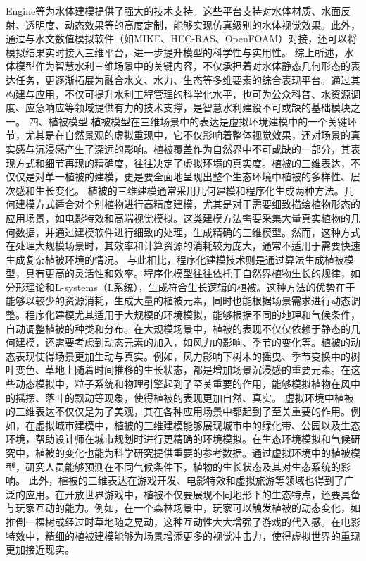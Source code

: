 Engine等为水体建模提供了强大的技术支持。这些平台支持对水体材质、水面反射、透明度、动态效果等的高度定制，能够实现仿真级别的水体视觉效果。此外，通过与水文数值模拟软件（如MIKE、HEC-RAS、OpenFOAM）对接，还可以将模拟结果实时接入三维平台，进一步提升模型的科学性与实用性。 综上所述，水体模型作为智慧水利三维场景中的关键内容，不仅承担着对水体静态几何形态的表达任务，更逐渐拓展为融合水文、水力、生态等多维要素的综合表现平台。通过其构建与应用，不仅可提升水利工程管理的科学化水平，也可为公众科普、水资源调度、应急响应等领域提供有力的技术支撑，是智慧水利建设不可或缺的基础模块之一。 四、植被模型 植被模型在三维场景中的表达是虚拟环境建模中的一个关键环节，尤其是在自然景观的虚拟重现中，它不仅影响着整体视觉效果，还对场景的真实感与沉浸感产生了深远的影响。植被覆盖作为自然界中不可或缺的一部分，其表现方式和细节再现的精确度，往往决定了虚拟环境的真实度。植被的三维表达，不仅仅是对单一植被的建模，更是要全面地呈现出整个生态环境中植被的多样性、层次感和生长变化。 植被的三维建模通常采用几何建模和程序化生成两种方法。几何建模方式适合对个别植物进行高精度建模，尤其是对于需要细致描绘植物形态的应用场景，如电影特效和高端视觉模拟。这类建模方法需要采集大量真实植物的几何数据，并通过建模软件进行细致的处理，生成精确的三维模型。然而，这种方式在处理大规模场景时，其效率和计算资源的消耗较为庞大，通常不适用于需要快速生成复杂植被环境的情况。 与此相比，程序化建模技术则是通过算法生成植被模型，具有更高的灵活性和效率。程序化模型往往依托于自然界植物生长的规律，如分形理论和L-systems（L系统），生成符合生长逻辑的植被。这种方法的优势在于能够以较少的资源消耗，生成大量的植被元素，同时也能根据场景需求进行动态调整。程序化建模尤其适用于大规模的环境模拟，能够根据不同的地理和气候条件，自动调整植被的种类和分布。在大规模场景中，植被的表现不仅仅依赖于静态的几何建模，还需要考虑到动态元素的加入，如风力的影响、季节的变化等。植被的动态表现使得场景更加生动与真实。例如，风力影响下树木的摇曳、季节变换中的树叶变色、草地上随着时间推移的生长状态，都是增加场景沉浸感的重要元素。在这些动态模拟中，粒子系统和物理引擎起到了至关重要的作用，能够模拟植物在风中的摇摆、落叶的飘动等现象，使得植被的表现更加自然、真实。 虚拟环境中植被的三维表达不仅仅是为了美观，其在各种应用场景中都起到了至关重要的作用。例如，在虚拟城市建模中，植被的三维建模能够展现城市中的绿化带、公园以及生态环境，帮助设计师在城市规划时进行更精确的环境模拟。在生态环境模拟和气候研究中，植被的变化也能为科学研究提供重要的参考数据。通过虚拟环境中的植被模型，研究人员能够预测在不同气候条件下，植物的生长状态及其对生态系统的影响。 此外，植被的三维表达在游戏开发、电影特效和虚拟旅游等领域也得到了广泛的应用。在开放世界游戏中，植被不仅要展现不同地形下的生态特点，还要具备与玩家互动的能力。例如，在一个森林场景中，玩家可以触发植被的动态变化，如推倒一棵树或经过时草地随之晃动，这种互动性大大增强了游戏的代入感。在电影特效中，精细的植被建模能够为场景增添更多的视觉冲击力，使得虚拟世界的重现更加接近现实。 